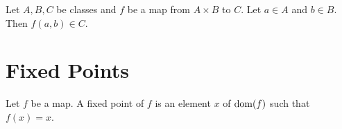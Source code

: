 \documentclass[10pt]{article}
\begin{document}
  \begin{forthel}
    \begin{proposition}
      Let $A, B, C$ be classes and $f$ be a map from $A \times B$ to $C$.
      Let $a \in A$ and $b \in B$.
      Then $f(a,b) \in C$.
    \end{proposition}
  \end{forthel}


  \section{Fixed Points}

  \begin{forthel}
    \begin{definition}
      Let $f$ be a map.
      A fixed point of $f$ is an element $x$ of $\operatorname{dom}(f)$ such that $f(x) = x$.
    \end{definition}
  \end{forthel}
\end{document}
